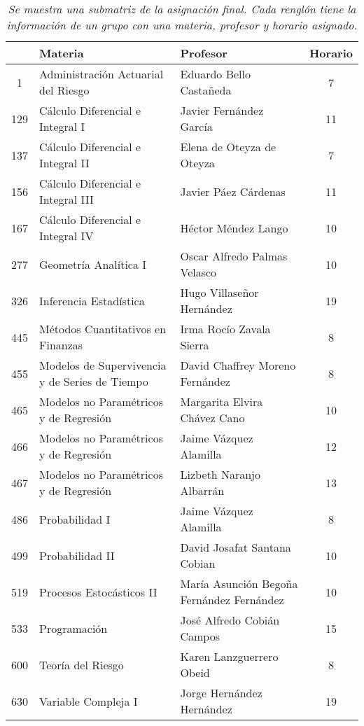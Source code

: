 \begin{table}[H]
\centering
\begin{tabular}{|c|p{7cm}|p{4.7cm}|c|}
\hline
\textbf{ } & \textbf{Materia} & \textbf{Profesor} & \textbf{Horario} \\ \hline
1 & Administración Actuarial del Riesgo & Eduardo Bello Castañeda & 7 \\ \hline
  129 & Cálculo Diferencial e Integral I & Javier Fernández García & 11 \\ \hline
  137 & Cálculo Diferencial e Integral II & Elena de Oteyza de Oteyza & 7 \\ \hline
  156 & Cálculo Diferencial e Integral III & Javier Páez Cárdenas & 11 \\ \hline
  167 & Cálculo Diferencial e Integral IV & Héctor Méndez Lango & 10 \\ \hline
  277 & Geometría Analítica I & Oscar Alfredo Palmas Velasco & 10 \\ \hline
  326 & Inferencia Estadística & Hugo Villaseñor Hernández & 19 \\ \hline
  445 & Métodos Cuantitativos en Finanzas & Irma Rocío Zavala Sierra & 8 \\ \hline
  455 & Modelos de Supervivencia y de Series de Tiempo & David Chaffrey Moreno Fernández & 8 \\ \hline
  465 & Modelos no Paramétricos y de Regresión & Margarita Elvira Chávez Cano & 10 \\ \hline
  466 & Modelos no Paramétricos y de Regresión & Jaime Vázquez Alamilla & 12 \\ \hline
  467 & Modelos no Paramétricos y de Regresión & Lizbeth Naranjo Albarrán & 13 \\ \hline
  486 & Probabilidad I & Jaime Vázquez Alamilla & 8 \\ \hline
  499 & Probabilidad II & David Josafat Santana Cobian & 10 \\ \hline
  519 & Procesos Estocásticos II & María Asunción Begoña Fernández Fernández & 10 \\ \hline
  533 & Programación & José Alfredo Cobián Campos & 15 \\ \hline
  600 & Teoría del Riesgo & Karen Lanzguerrero Obeid & 8 \\ \hline
  630 & Variable Compleja I & Jorge Hernández Hernández & 19 \\ \hline
\end{tabular}
\caption[\textit{Submatriz con asignación final}]{\textit{Se muestra una submatriz de la asignación final. Cada renglón tiene la información de un grupo con una materia, profesor y horario asignado.}}\label{submatAsigFinal}
\end{table}




